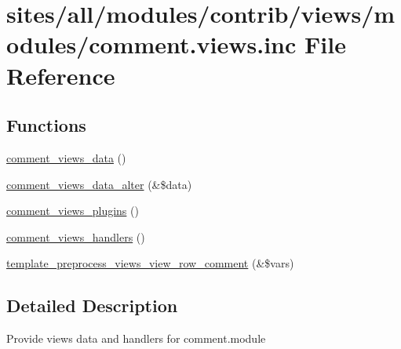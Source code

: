 \hypertarget{comment_8views_8inc}{
\section{sites/all/modules/contrib/views/modules/comment.views.inc File Reference}
\label{comment_8views_8inc}
}
\subsection*{Functions}
\begin{CompactItemize}
\item 
\hyperlink{group__views__comment__module_g36dff975ac53893da10163d2ee59d652}{comment\_\-views\_\-data} ()
\item 
\hyperlink{group__views__comment__module_gf68bf474455d07d3fc30c9f61b830f30}{comment\_\-views\_\-data\_\-alter} (\&\$data)
\item 
\hyperlink{group__views__comment__module_g20b0377d6793f1f1e1b70bcae9dd067b}{comment\_\-views\_\-plugins} ()
\item 
\hyperlink{group__views__comment__module_gf77bd2e2e209c8442ed09037243c879b}{comment\_\-views\_\-handlers} ()
\item 
\hyperlink{group__views__comment__module_gc5f17442ee6b1364544217dc2515f0ef}{template\_\-preprocess\_\-views\_\-view\_\-row\_\-comment} (\&\$vars)
\end{CompactItemize}


\subsection{Detailed Description}
Provide views data and handlers for comment.module 